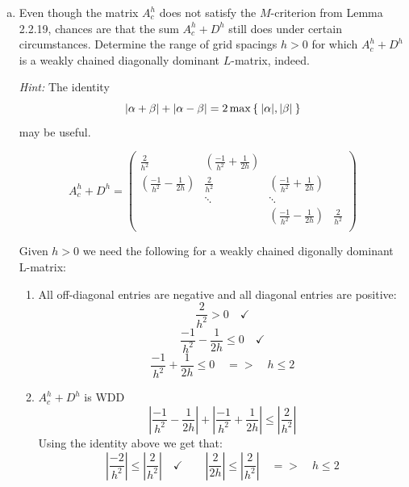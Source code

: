 \documentclass[10pt,letterpaper]{scrartcl}
\begin{document}
\begin{enumerate}[(a)]
          
\vfill

\item Even though the matrix $A^h_c$ does not satisfy the $M$-criterion from Lemma 2.2.19, chances are that the sum $A^h_c + D^h$ still does under certain circumstances. Determine the range of grid spacings $h>0$ for which $A^h_c + D^h$ is a weakly chained diagonally dominant $L$-matrix, indeed.

\emph{Hint:} The identity
\begin{equation*}
\lvert \alpha + \beta \rvert + \lvert \alpha - \beta \rvert = 2\max\Set{\lvert \alpha \rvert,\lvert \beta \rvert}
\end{equation*}
may be useful.

\begin{equation*}
A^h_c + D^h = \left(
\begin{array}{cccc}
\frac{2}{h^2} & \left(\frac{-1}{h^2} + \frac{1}{2h}\right)\\
\left(\frac{-1}{h^2} - \frac{1}{2h}\right) & \frac{2}{h^2} & \left(\frac{-1}{h^2} + \frac{1}{2h}\right)\\
& \ddots & \ddots\\
& & \left(\frac{-1}{h^2} - \frac{1}{2h}\right) & \frac{2}{h^2}\\
\end{array}
\right)
\end{equation*}

Given $h > 0$ we need the following for a weakly chained digonally dominant L-matrix:
\begin{enumerate}
    \item All off-diagonal entries are negative and all diagonal entries are positive:
        \begin{equation*}
            \frac{2}{h^2} > 0 \quad \checkmark
        \end{equation*}
        \begin{equation*}
            \frac{-1}{h^2} - \frac{1}{2h} \leq 0 \quad \checkmark
        \end{equation*}
        \begin{equation*}
            \frac{-1}{h^2} + \frac{1}{2h} \leq 0 \quad => \quad h \leq 2
        \end{equation*}
    \item $A^h_c+D^h$ is WDD
        \begin{equation*}
            \left|\frac{-1}{h^2} - \frac{1}{2h}\right| + \left|\frac{-1}{h^2} + \frac{1}{2h}\right| \leq \left|\frac{2}{h^2}\right|
        \end{equation*}
        Using the identity above we get that:
        \begin{equation*}
            \left|\frac{-2}{h^2}\right| \leq \left|\frac{2}{h^2}\right| \quad \checkmark \qquad \left|\frac{2}{2h}\right| \leq \left|\frac{2}{h^2}\right| \quad => \quad h \leq 2 
        \end{equation*}



\end{enumerate}
\end{enumerate}
\end{document}
